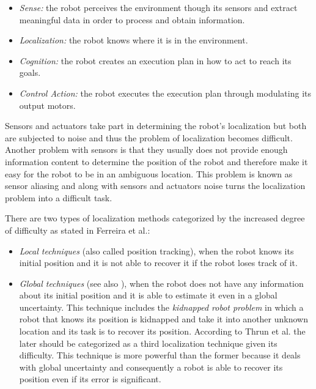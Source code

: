 \begin{itemize}
\item \textit{Sense:} the robot perceives the environment though its sensors and extract meaningful data in order to process and obtain information.
\item \textit{Localization:} the robot knows where it is in the environment.
\item \textit{Cognition:} the robot creates an execution plan in how to act to reach its goals.
\item \textit{Control Action:} the robot executes the execution plan through modulating its output motors.
\end{itemize}

Sensors and actuators take part in determining the robot's localization but both are subjected to noise and thus the problem of localization becomes difficult. Another problem with sensors is that they usually does not provide enough information content to determine the position of the robot and therefore make it easy for the robot to be in an ambiguous location. This problem is known as sensor aliasing and along with sensors and actuators noise turns the localization problem into a difficult task\cite{Siegwart:intro-autonumous-robots}.

There are two types of localization methods categorized by the increased degree of difficulty as stated in Ferreira et al.\cite{Ferreira:prob}: 

\begin{itemize}
\item \textit{Local techniques} (also called position tracking\cite{Thrun:2005:PR:1121596}), when the robot knows its initial position and it is not able to recover it if the robot loses track of it.
\item \textit{Global techniques} (see also \cite{Feng:where-am-I}), when the robot does not have any information about its initial position and it is able to estimate it even in a global uncertainty. This technique includes the \textit{kidnapped robot problem} in which a robot that knows its position is kidnapped and take it into another unknown location and its task is to recover its position. According to Thrun et al.\cite{Thrun:2005:PR:1121596} the later should be categorized as a third localization technique given its difficulty. This technique is more powerful than the former because it deals with global uncertainty and consequently a robot is able to recover its position even if its error is significant.
\end{itemize}

